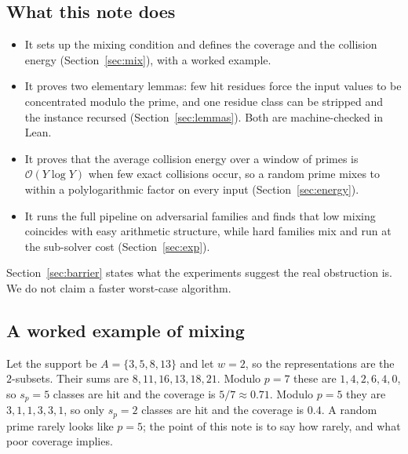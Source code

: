 \documentclass[conference]{IEEEtran}
\newcommand{\Oh}{\mathcal{O}}
\begin{document}
\subsection{What this note does}
\begin{itemize}
\item It sets up the mixing condition and defines the coverage and the collision
energy (Section~\ref{sec:mix}), with a worked example.
\item It proves two elementary lemmas: few hit residues force the input values to
be concentrated modulo the prime, and one residue class can be stripped and the
instance recursed (Section~\ref{sec:lemmas}). Both are machine-checked in Lean.
\item It proves that the average collision energy over a window of primes is
$\Oh(Y\log Y)$ when few exact collisions occur, so a random prime mixes to within
a polylogarithmic factor on every input (Section~\ref{sec:energy}).
\item It runs the full pipeline on adversarial families and finds that low mixing
coincides with easy arithmetic structure, while hard families mix and run at the
sub-solver cost (Section~\ref{sec:exp}).
\end{itemize}
Section~\ref{sec:barrier} states what the experiments suggest the real
obstruction is. We do not claim a faster worst-case algorithm.

\subsection{A worked example of mixing}
Let the support be $A=\{3,5,8,13\}$ and let $w=2$, so the representations are the
$2$-subsets. Their sums are $8,11,16,13,18,21$. Modulo $p=7$ these are
$1,4,2,6,4,0$, so $s_p=5$ classes are hit and the coverage is $5/7\approx0.71$.
Modulo $p=5$ they are $3,1,1,3,3,1$, so only $s_p=2$ classes are hit and the
coverage is $0.4$. A random prime rarely looks like $p=5$; the point of this note
is to say how rarely, and what poor coverage implies.
\end{document}
